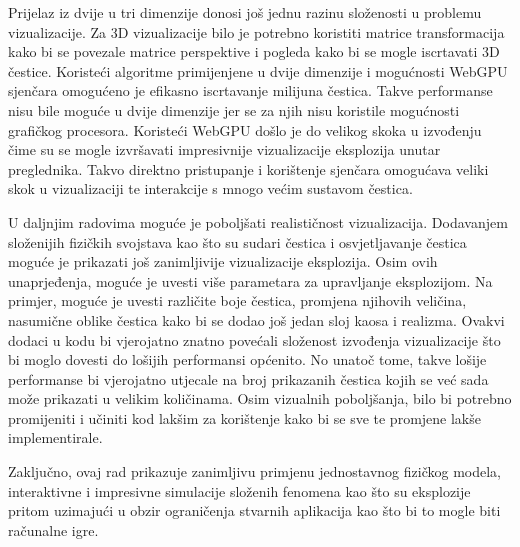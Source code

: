 \documentclass{foi}
\begin{document}
Prijelaz iz dvije u tri dimenzije donosi još jednu razinu složenosti u problemu vizualizacije. Za 3D vizualizacije bilo je potrebno koristiti matrice transformacija kako bi se povezale matrice perspektive i pogleda kako bi se mogle iscrtavati 3D čestice. Koristeći algoritme primijenjene u dvije dimenzije i mogućnosti WebGPU sjenčara omogućeno je efikasno iscrtavanje milijuna čestica. Takve performanse nisu bile moguće u dvije dimenzije jer se za njih nisu koristile mogućnosti grafičkog procesora. Koristeći WebGPU došlo je do velikog skoka u izvođenju čime su se mogle izvršavati impresivnije vizualizacije eksplozija unutar preglednika. Takvo direktno pristupanje i korištenje sjenčara omogućava veliki skok u vizualizaciji te interakcije s mnogo većim sustavom čestica. 

U daljnjim radovima moguće je poboljšati realističnost vizualizacija. Dodavanjem složenijih fizičkih svojstava kao što su sudari čestica i osvjetljavanje čestica moguće je prikazati još zanimljivije vizualizacije eksplozija. Osim ovih unaprjeđenja, moguće je uvesti više parametara za upravljanje eksplozijom. Na primjer, moguće je uvesti različite boje čestica, promjena njihovih veličina, nasumične oblike čestica kako bi se dodao još jedan sloj kaosa i realizma. Ovakvi dodaci u kodu bi vjerojatno znatno povećali složenost izvođenja vizualizacije što bi moglo dovesti do lošijih performansi općenito. No unatoč tome, takve lošije performanse bi vjerojatno utjecale na broj prikazanih čestica kojih se već sada može prikazati u velikim količinama. Osim vizualnih poboljšanja, bilo bi potrebno promijeniti i učiniti kod lakšim za korištenje kako bi se sve te promjene lakše implementirale.

Zaključno, ovaj rad prikazuje zanimljivu primjenu jednostavnog fizičkog modela, interaktivne i impresivne simulacije složenih fenomena kao što su eksplozije pritom uzimajući u obzir ograničenja stvarnih aplikacija kao što bi to mogle biti računalne igre.

\printbibliography[title=Popis literature]

\listoffigures
{}

\appendix
\renewcommand{\thechapter}{\arabic{chapter}}
\end{document}
